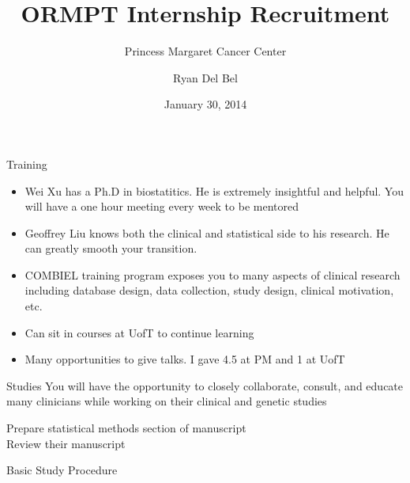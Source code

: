 \documentclass[pdf]{beamer}
\title[Princess Margaret Cancer Center]{ORMPT Internship Recruitment}
\subtitle{Princess Margaret Cancer Center}
\author{Ryan Del Bel}
\date{January 30, 2014}
\institute[uw]{University of Waterloo}
\theoremstyle{definition}
\begin{document}
\begin{frame}
\titlepage
\end{frame}

\begin{frame}{Training}
\begin{itemize}
\item Wei Xu has a Ph.D in biostatitics. He is extremely insightful and helpful. You will have a one hour meeting every week to be mentored
\item Geoffrey Liu knows both the clinical and statistical side to his research. He can greatly smooth your transition.
\item COMBIEL training program exposes you to many aspects of clinical research including database design, data collection, study design, clinical motivation, etc.
\item Can sit in courses at UofT to continue learning
\item Many opportunities to give talks. I gave 4.5 at PM and 1 at UofT
\end{itemize}


\end{frame}

\begin{frame}{Studies}
You will have the opportunity to closely collaborate, consult, and educate many clinicians while working on their clinical and genetic studies


\begin{algorithm}[H]
 Prepare statistical methods section of manuscript\\
 Review their manuscript
 \caption{Basic Study Procedure}
\end{algorithm}


\end{frame}
\end{document}
